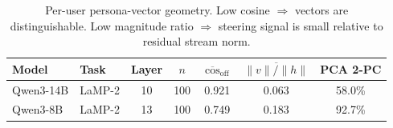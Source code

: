 \begin{table}[t]
\centering\small
\begin{tabular}{llccccc}
\toprule
Model & Task & Layer & $n$ & $\overline{\cos}_{\mathrm{off}}$ & $\overline{\|v\|/\|h\|}$ & PCA 2-PC \\
\midrule
Qwen3-14B & LaMP-2 & 10 & 100 & 0.921 & 0.063 & 58.0\% \\
Qwen3-8B & LaMP-2 & 13 & 100 & 0.749 & 0.183 & 92.7\% \\
\bottomrule
\end{tabular}
\caption{Per-user persona-vector geometry. Low cosine $\Rightarrow$ vectors are distinguishable. Low magnitude ratio $\Rightarrow$ steering signal is small relative to residual stream norm.}
\label{tab:geometry}
\end{table}
